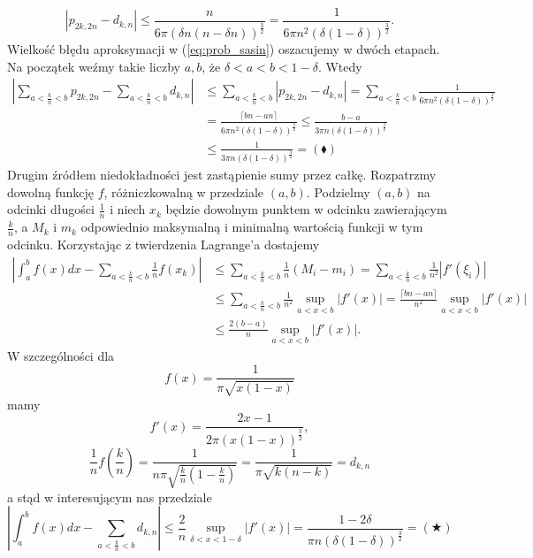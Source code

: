 \documentclass[a4paper,11pt,twoside]{book}
\newcommand{\ceil}[1]{\lceil#1\rceil}
\theoremstyle{definition}
\begin{document}
\[ |p_{2k,2n} - d_{k,n}| \leq \frac{n}{6\pi\left( \delta n (n- \delta n) \right)^{\frac{3}{2}}} = \frac{1}{6\pi n^2 \left( \delta(1- \delta) \right)^{\frac{3}{2}}}.  \]
Wielkość błędu aproksymacji w (\ref{eq:prob_sasin}) oszacujemy w dwóch etapach. Na początek weźmy takie liczby $a,b$, że $\delta < a < b < 1 - \delta$.
Wtedy
\begin{equation*}
 \begin{split}
  \left| \sum_{a < \frac{k}{n} < b} p_{2k,2n} -  \sum_{a < \frac{k}{n} < b}  d_{k,n} \right| &\leq \sum_{a < \frac{k}{n} < b} \left|  p_{2k,2n} -  d_{k,n} \right| = \sum_{a < \frac{k}{n} < b} \frac{1}{6\pi n^2 \left( \delta(1- \delta) \right)^{\frac{3}{2}}} \\
  &= \frac{\ceil{bn - an}}{6\pi n^2 \left( \delta(1- \delta) \right)^{\frac{3}{2}}} \leq \frac{b - a}{3\pi n \left( \delta(1- \delta) \right)^{\frac{3}{2}}} \\
  &\leq \frac{1}{3\pi n \left( \delta(1- \delta) \right)^{\frac{3}{2}}} = (\blacklozenge)
 \end{split}
\end{equation*}
Drugim źródłem niedokładności jest zastąpienie sumy przez całkę. Rozpatrzmy dowolną funkcję $f$, różniczkowalną w przedziale $(a,b)$. Podzielmy $(a,b)$ na odcinki długości $\frac{1}{n}$ i niech $x_k$ będzie dowolnym punktem w odcinku zawierającym $\frac{k}{n}$, a $M_k$ i $m_k$ odpowiednio maksymalną i minimalną wartością funkcji w tym odcinku. Korzystając z twierdzenia Lagrange'a dostajemy
\begin{equation}
 \begin{split}
    \left| \int_a^b f(x) dx - \sum\limits_{a < \frac{k}{n} < b}\frac{1}{n}f(x_k) \right| &\leq \sum\limits_{a < \frac{k}{n} < b}\frac{1}{n}(M_i - m_i) = \sum\limits_{a < \frac{k}{n} < b}\frac{1}{n^2}|f'(\xi_i)| \\
    &\leq \sum\limits_{a < \frac{k}{n} < b}\frac{1}{n^2} \sup_{a < x < b} |f'(x)| = \frac{\ceil{bn-an}}{n^2} \sup_{a < x < b} |f'(x)| \\
    &\leq \frac{2(b-a)}{n} \sup_{a < x < b} |f'(x)|.
 \end{split}
\end{equation}
W szczególności dla
\[ f(x) = \frac{1}{\pi \sqrt{x(1-x)}} \] mamy
\[ f'(x) = \frac{2x-1}{2 \pi (x(1-x))^{\frac{3}{2}}}, \]
\[ \frac{1}{n}f\left(\frac{k}{n} \right) = \frac{1}{n\pi \sqrt{ \frac{k}{n}(1-\frac{k}{n})}} = \frac{1}{\pi \sqrt{k(n-k)}} = d_{k,n}  \]
a stąd w interesującym nas przedziale
\[  \left| \int_a^b f(x) dx - \sum\limits_{a < \frac{k}{n} < b}d_{k,n} \right| \leq \frac{2}{n} \sup_{\delta < x < 1-\delta} |f'(x)| = \frac{1 - 2\delta}{\pi n (\delta(1-\delta))^{\frac{3}{2}}} = (\bigstar) \]
\end{document}

